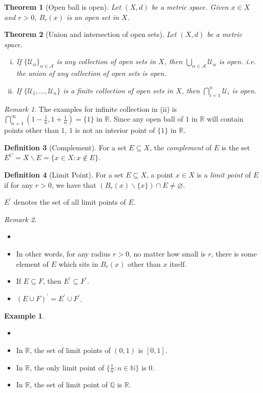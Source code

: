 \documentclass[12pt, lettersize]{book}
\theoremstyle{plain}
\newtheorem{thm}{Theorem}[section]
\theoremstyle{definition}
\newtheorem{dfn}[thm]{Definition}
\newtheorem*{eg}{Example}
\theoremstyle{remark}
\newtheorem*{rem}{Remark}
\newcommand{\R}{\mathbb{R}}
\newcommand{\N}{\mathbb{N}}
\newcommand{\Q}{\mathbb{Q}}
\let\emptyset\varnothing
\begin{document}
	\begin{thm}[Open ball is open]
		Let $(X,d)$ be a metric space. Given $x\in X$ and $r>0$, $B_r(x)$ is an open set in $X$.
	\end{thm}
	
	\begin{thm}[Union and intersection of open sets]\label{thm: Union and intersection of open sets}
		Let $(X,d)$ be a metric space.
		\begin{enumerate}[(i)]
			\item If $\{\mathcal{U}_\alpha\}_{\alpha\in \mathcal{A}}$ is any collection of open sets in $X$, then $\bigcup_{\alpha\in \mathcal{A}}\mathcal{U}_\alpha$ is open. i.e. the union of \emph{any} collection of open sets is open.
			\item If $\{\mathcal{U}_1,\dots,\mathcal{U}_n\}$ is a finite collection of open sets in $X$, then $\bigcap_{i=1}^{n}\mathcal{U}_i$ is open.
		\end{enumerate}
	\end{thm}
	\begin{rem}
		The examples for infinite collection in (ii) is $\bigcap_{n=1}^{\infty}(1-\frac{1}{n}, 1+\frac{1}{n})=\{1\}$ in $\R$. Since any open ball of $1$ in $\R$ will contain points other than $1$, $1$ is not an interior point of $\{1\}$ in $\R$.  
	\end{rem}
	
	\begin{dfn}[Complement]
		For a set $E\subseteq X$, the \emph{complement} of $E$ is the set $E^C=X\backslash E=\{x\in X: x\notin E\}$.
	\end{dfn}
	
	\begin{dfn}[Limit Point]
		For a set $E\subseteq X$, a point $x\in X$ is a \emph{limit point} of $E$ if for any $r>0$, we have that $(B_r(x)\backslash\{x\})\cap E\neq\emptyset$.\smallskip
		
		$E^\prime$ denotes the set of all limit points of $E$.
	\end{dfn}
	\begin{rem}
		\begin{itemize}
			\item[]
			\item In other words, for any radius $r>0$, no matter how small is $r$, there is some element of $E$ which sits in $B_r(x)$ other than $x$ itself. 
			\item If $E\subseteq F$, then $E^\prime\subseteq F^\prime$.
			\item $(E\cup F)^\prime=E^\prime\cup F^\prime$.
		\end{itemize}
	\end{rem}
	\begin{eg}
		\begin{itemize}
			\item[]
			\item In $\R$, the set of limit points of $(0,1)$ is $[0,1]$.
			\item In $\R$, the only limit point of $\{\frac{1}{n}: n\in\N\}$ is $0$.
			\item In $\R$, the set of limit point of $\Q$ is $\R$. 
		\end{itemize}
	\end{eg}
	
\end{document}
